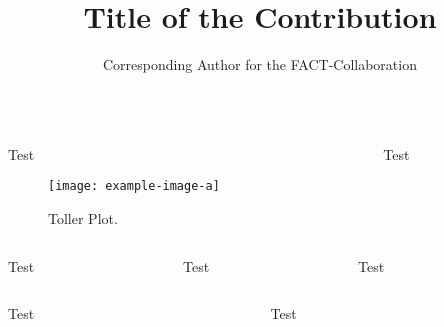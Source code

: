 \documentclass[t]{beamer}
\title{Title of the Contribution}
\author{Corresponding Author for the FACT-Collaboration}
\newlength{\thirdtextwidth}
\begin{document}
%
\begin{columns}[onlytextwidth]%
  \begin{column}{0.5\textwidth}%
    \begin{block}[equal height group=A]{Test}%
      \begin{multicols}{2}
        \begin{figure}
          \texttt{[image: example-image-a]}\\
          \caption{Toller Plot.\cite{fact-performance}}\label{fig:tollerplot}
        \end{figure}
        \columnbreak
        \blindtext
      \end{multicols}
    \end{block}%
  \end{column}%
  \begin{column}{0.5\textwidth}%
    \begin{alertblock}[equal height group=A]{Test}%
      \begin{multicols}{2}
        \blindtext\cite{fact-reference}
        \blindtext 
      \end{multicols}
    \end{alertblock}%
  \end{column}%
\end{columns}%
\begin{columns}[c, onlytextwidth]%
  \begin{column}{\thirdtextwidth}%
    \begin{exampleblock}{Test}%
      \blindtext%
    \end{exampleblock}%
  \end{column}%
  \begin{column}{\thirdtextwidth}%
    \begin{block}{Test}%
      \blindtext%
    \end{block}%
  \end{column}%
  \begin{column}{\thirdtextwidth}%
    \begin{block}{Test}%
      \blindtext%
    \end{block}%
  \end{column}%
\end{columns}%
\begin{columns}[onlytextwidth]%
  \begin{column}{0.5\textwidth}%
    \begin{block}{Test}%
      \blindtext%
    \end{block}%
  \end{column}%
  \begin{column}{0.5\textwidth}%
    \begin{block}{Test}%
      \blindtext%
    \end{block}%
  \end{column}%
\end{columns}%
\end{document}
